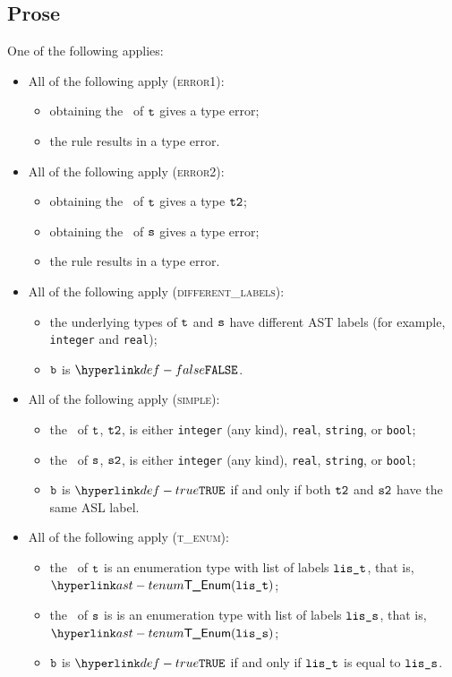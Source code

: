 \subsection{Prose}
One of the following applies:
\begin{itemize}
\item All of the following apply (\textsc{error1}):
  \begin{itemize}
  \item obtaining the \underlyingtype\ of $\texttt{t}$ gives a type error;
  \item the rule results in a type error.
  \end{itemize}

\item All of the following apply (\textsc{error2}):
  \begin{itemize}
    \item obtaining the \underlyingtype\ of $\texttt{t}$ gives a type $\texttt{t2}$;
    \item obtaining the \underlyingtype\ of $\texttt{s}$ gives a type error;
    \item the rule results in a type error.
    \end{itemize}

\item All of the following apply (\textsc{different\_labels}):
  \begin{itemize}
  \item the underlying types of $\texttt{t}$ and $\texttt{s}$ have different AST labels
  (for example, \texttt{integer} and \texttt{real});
  \item $\texttt{b}$ is $\False$.
  \end{itemize}

\item All of the following apply (\textsc{simple}):
  \begin{itemize}
  \item the \underlyingtype\ of $\texttt{t}$, $\texttt{t2}$, is either \texttt{integer} (any kind), \texttt{real}, \texttt{string}, or \texttt{bool};
  \item the \underlyingtype\ of $\texttt{s}$, $\texttt{s2}$, is either \texttt{integer} (any kind), \texttt{real}, \texttt{string}, or \texttt{bool};
  \item $\texttt{b}$ is $\True$ if and only if both $\texttt{t2}$ and $\texttt{s2}$ have the same ASL label.
  \end{itemize}

\item All of the following apply (\textsc{t\_enum}):
  \begin{itemize}
  \item the \underlyingtype\ of $\texttt{t}$ is an enumeration type with list of labels $\texttt{lis\_t}$, that is, $\TEnum(\vlit)$;
  \item the \underlyingtype\ of $\texttt{s}$ is is an enumeration type with list of labels $\texttt{lis\_s}$, that is, $\TEnum(\vlis)$;
  \item $\texttt{b}$ is $\True$ if and only if $\texttt{lis\_t}$ is equal to $\texttt{lis\_s}$.
  \end{itemize}


\end{itemize}
